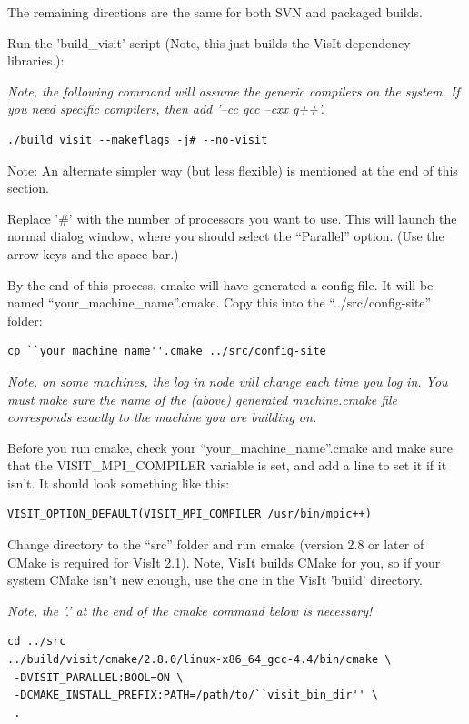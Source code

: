 \documentclass[12pt]{article}
\begin{document}
The remaining directions are the same for both SVN and packaged builds.

Run the 'build\_visit' script (Note, this just builds the VisIt dependency
libraries.):

\emph{Note, the following command will assume the generic compilers on
  the system.  If you need specific compilers, then add '--cc gcc --cxx g++'.
}

\begin{verbatim}
./build_visit --makeflags -j# --no-visit
\end{verbatim}

Note: An alternate simpler way (but less flexible) is mentioned at the end
of this section.

Replace '\#' with the number of processors you want to use.  This
will launch the normal dialog window, where you should select
the ``Parallel'' option.  (Use the arrow keys and the space bar.)

By the end of this process, cmake will have generated a config file. It will
be named ``your\_machine\_name''.cmake. Copy this into the
``../src/config-site'' folder:

\begin{verbatim}
cp ``your_machine_name''.cmake ../src/config-site
\end{verbatim}

\emph{Note, on some machines, the log in node will change each time
  you log in.  You must make sure the name of the (above) generated
  machine.cmake file corresponds exactly to the machine you are
  building on.}


Before you run cmake, check your ``your\_machine\_name''.cmake
and make sure that the VISIT\_MPI\_COMPILER variable is set, and add
a line to set it if it isn't.  It should look something like this:

\begin{verbatim}
VISIT_OPTION_DEFAULT(VISIT_MPI_COMPILER /usr/bin/mpic++)
\end{verbatim}

Change directory to the ``src'' folder and run cmake (version 2.8 or
later of CMake is required for VisIt 2.1).  Note, VisIt builds CMake for
you, so if your system CMake isn't new enough, use the one
in the VisIt 'build' directory.

\emph{Note, the '.' at the end of the cmake command below is necessary!}

\begin{verbatim}
cd ../src
../build/visit/cmake/2.8.0/linux-x86_64_gcc-4.4/bin/cmake \
 -DVISIT_PARALLEL:BOOL=ON \
 -DCMAKE_INSTALL_PREFIX:PATH=/path/to/``visit_bin_dir'' \
 .
\end{verbatim}
\end{document}
